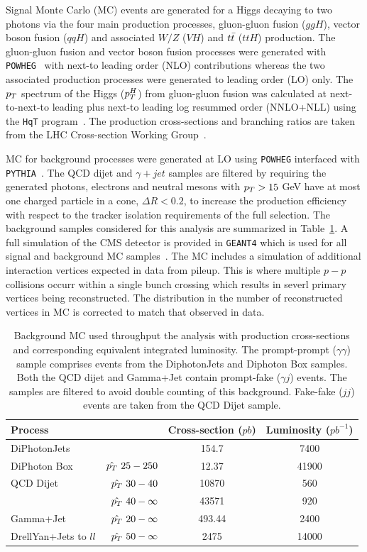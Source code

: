 Signal Monte Carlo (MC) events are generated for a Higgs decaying to two photons via the four main 
production processes, gluon-gluon fusion ($ggH$), vector boson fusion ($qqH$) and associated $W/Z$ ($VH$) 
and $t\bar{t}$ ($ttH$) production.
The gluon-gluon fusion and vector boson fusion processes were generated with \texttt{POWHEG}~\citep{powheg} with 
next-to leading order (NLO) contributions whereas
the two associated production processes were generated to leading order (LO) only.
The $p_{T}$ spectrum of the Higgs ($p_{T}^{H}$) from gluon-gluon fusion was calculated at
next-to-next-to leading plus next-to leading log resummed order (NNLO+NLL) using the \texttt{HqT} program~\citep{hqt}.
The production cross-sections and branching ratios are taken from the LHC Cross-section Working Group~\citep{lhcxswg}.

MC for background processes were generated at LO using \texttt{POWHEG} interfaced with \texttt{PYTHIA}~\citep{pythia}.
The QCD dijet and $\gamma+jet$ samples are filtered by requiring the generated photons, electrons and neutral
mesons with $p_{T}>15$ GeV have at most one charged particle in a cone, $\Delta R<0.2$, to increase the 
production efficiency with respect to the tracker isolation requirements of the full selection.
The background samples considered for this analysis are summarized in Table~\ref{tab:backgroundmc}.
A full simulation of the CMS detector is provided in \texttt{GEANT4} which is used for all signal
and background MC samples~\citep{geant4}. The MC includes a simulation of additional interaction vertices expected in data
from pileup. This is where multiple $p-p$ collisions occurr within a single bunch crossing which results in severl
primary vertices being reconstructed. The distribution in the number of reconstructed vertices in 
MC is corrected to match that observed in data.

\begin{table}
\begin{tabular}{|l r|c|c|}
\hline
\textbf{Process}  & &  \textbf{Cross-section} ($pb$) & \textbf{Luminosity} ($pb^{-1}$)\\
\hline
\hline
DiPhotonJets & & 154.7 & 7400 \\
\hline
DiPhoton Box & $\hat{p_{T}}~25-250$ & 12.37 & 41900 \\
\hline 
QCD Dijet    & $\hat{p_{T}}~30-40$      & 10870 & 560 \\
	     & $\hat{p_{T}}~40-\infty$  & 43571 & 920 \\
\hline 
Gamma+Jet    & $\hat{p_{T}}~20-\infty$  & 493.44& 2400 \\
\hline 
DrellYan+Jets to $ll$  & $\hat{p_{T}}~50-\infty$  & 2475& 14000 \\
\hline
\end{tabular}
\caption{Background MC used throughput the analysis with production cross-sections and 
corresponding equivalent integrated luminosity. The prompt-prompt ($\gamma\gamma$) sample 
comprises events from the DiphotonJets and Diphoton Box samples. Both the QCD dijet and Gamma+Jet
 contain prompt-fake ($\gamma j$) events. The samples are filtered to avoid double counting
of this background. Fake-fake ($jj$) events are taken from the QCD Dijet sample.}
\label{tab:backgroundmc}
\end{table}

